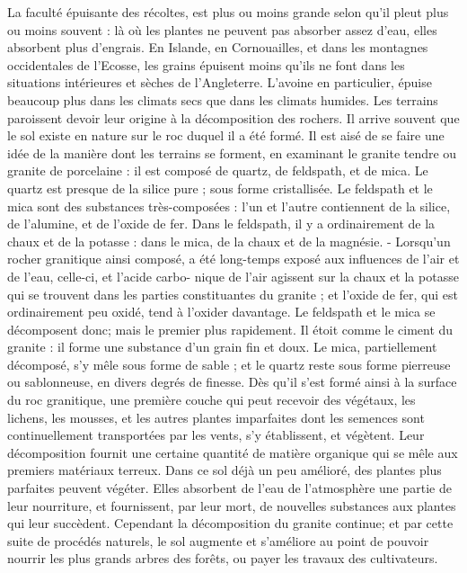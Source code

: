 La faculté épuisante des récoltes, est plus\setcounter{page}{467} ou moins grande selon qu'il pleut plus ou moins souvent : là où les plantes ne peuvent pas absorber assez d'eau, elles absorbent plus d'engrais. En Islande, en Cornouailles, et dans les montagnes occidentales de l'Ecosse, les grains épuisent moins qu'ils ne font dans les situations intérieures et sèches de l'Angleterre. L'avoine en particulier, épuise beaucoup plus dans les climats secs que dans les climats humides.
Les terrains paroissent devoir leur origine à la décomposition des rochers. Il arrive souvent que le sol existe en nature sur le roc duquel il a été formé. Il est aisé de se faire une idée de la manière dont les terrains se forment, en examinant le granite tendre ou granite de porcelaine : il est composé de quartz, de feldspath, et de mica.
Le quartz est presque de la silice pure ; sous forme cristallisée. Le feldspath et le mica sont des substances très-composées : l'un et l'autre contiennent de la silice, de l'alumine, et de l'oxide de fer. Dans le feldspath, il y a ordinairement de la chaux et de la potasse : dans le mica, de la chaux et de la magnésie.
- Lorsqu'un rocher granitique ainsi composé,
a été long-temps exposé aux influences de
l'air et de l'eau, celle-ci, et l'acide carbo-\setcounter{page}{468} nique de l'air agissent sur la chaux et la potasse qui se trouvent dans les parties constituantes du granite ; et l'oxide de fer, qui est ordinairement peu oxidé, tend à l'oxider davantage. Le feldspath et le mica se décomposent donc; mais le premier plus rapidement. Il étoit comme le ciment du granite : il forme une substance d'un grain fin et doux. Le mica, partiellement décomposé, s'y mêle sous forme de sable ; et le quartz reste sous forme pierreuse ou sablonneuse, en divers degrés de finesse. Dès qu'il s'est formé ainsi à la surface du roc granitique, une première couche qui peut recevoir des végétaux, les lichens, les mousses, et les autres plantes imparfaites dont les semences sont continuellement transportées par les vents, s'y établissent, et végètent. Leur décomposition fournit une certaine quantité de matière organique qui se mêle aux premiers matériaux terreux. Dans ce sol déjà un peu amélioré, des plantes plus parfaites peuvent végéter. Elles absorbent de l'eau de l'atmosphère une partie de leur nourriture, et fournissent, par leur mort, de nouvelles substances aux plantes qui leur succèdent. Cependant la décomposition du granite continue; et par cette suite de procédés naturels, le sol augmente et s'améliore\setcounter{page}{469} au point de pouvoir nourrir les plus grands arbres des forêts, ou payer les travaux des cultivateurs.
